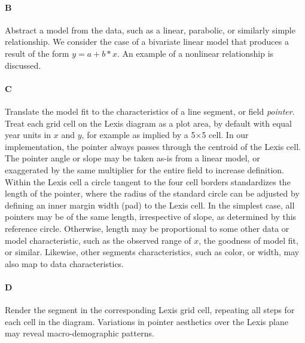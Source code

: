 \documentclass{article}
\begin{document}
\paragraph{\textbf{B}} Abstract a model from the data, such as a linear, parabolic, or similarly simple relationship. We consider the case of a bivariate linear model that produces a result of the form $y = a + b*x$. An example of a nonlinear relationship is discussed. 
\paragraph{\textbf{C}} Translate the model fit to the characteristics of a line segment, or field \emph{pointer}. Treat each grid cell on the Lexis diagram as a plot area, by default with equal year units in $x$ and $y$, for example as implied by a 5$\times$5 cell. In our implementation, the pointer always passes through the centroid of the Lexis cell. The pointer angle or slope may be taken as-is from a linear model, or exaggerated by the same multiplier for the entire field to increase definition. Within the Lexis cell a circle tangent to the four cell borders standardizes the length of the pointer, where the radius of the standard circle can be adjusted by defining an inner margin width (pad) to the Lexis cell. In the simplest case, all pointers may be of the same length, irrespective of slope, as determined by this reference circle. Otherwise, length may be proportional to some other data or model characteristic, such as the observed range of $x$, the goodness of model fit, or similar. Likewise, other segments characteristics, such as color, or width, may also map to data characteristics.
\paragraph{\textbf{D}} Render the segment in the corresponding Lexis grid cell, repeating all steps for each cell in the diagram. Variations in pointer aesthetics over the Lexis plane may reveal macro-demographic patterns.
\end{document}
